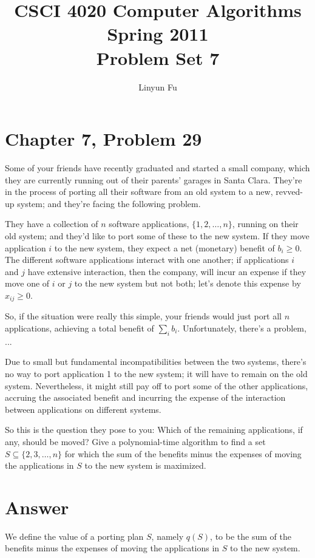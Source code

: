 \documentclass[12pt,letterpaper]{article}
\author{Linyun Fu}
\title{CSCI 4020 Computer Algorithms Spring 2011\\
Problem Set 7}
\begin{document}
\maketitle
\section*{Chapter 7, Problem 29}
Some of your friends have recently graduated and started a small company,
which they are currently running out of their parents' garages in
Santa Clara. They're in the process of porting all their software from an
old system to a new, revved-up system; and they're facing the following
problem.

They have a collection of $n$ software applications, $\{1, 2, \dots, n\}$, running
on their old system; and they'd like to port some of these to the new
system. If they move application $i$ to the new system, they expect a net
(monetary) benefit of $b_i \ge 0$. The different software applications interact
with one another; if applications $i$ and $j$ have extensive interaction, then
the company, will incur an expense if they move one of $i$ or $j$ to the new
system but not both; let's denote this expense by $x_{ij} \ge 0$.

So, if the situation were really this simple, your friends would just
port all $n$ applications, achieving a total benefit of $\sum_i b_i$. Unfortunately,
there's a problem, ...

Due to small but fundamental incompatibilities between the two
systems, there's no way to port application 1 to the new system; it will
have to remain on the old system. Nevertheless, it might still pay off to
port some of the other applications, accruing the associated benefit and
incurring the expense of the interaction between applications on different
systems.

So this is the question they pose to you: Which of the remaining
applications, if any, should be moved? Give a polynomial-time algorithm
to find a set $S \subseteq \{2, 3, \dots, n\}$ for which the sum of the benefits minus the
expenses of moving the applications in $S$ to the new system is maximized.

\section*{Answer}
We define the value of a porting plan $S$, namely $q(S)$, to be the sum of the benefits minus the
expenses of moving the applications in $S$ to the new system.
\end{document}
